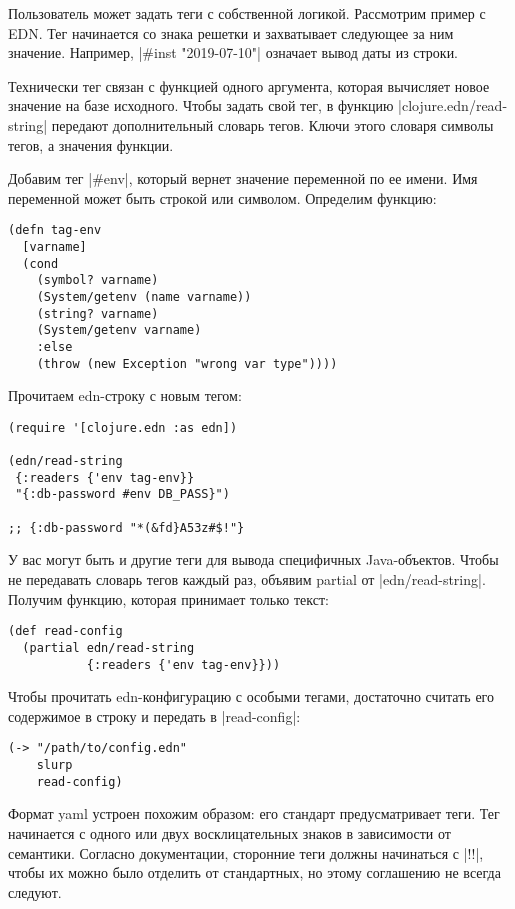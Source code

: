 Пользователь может задать теги с собственной логикой. Рассмотрим пример с
EDN. Тег начинается со знака решетки и захватывает следующее за ним
значение. Например, \spverb|#inst "2019-07-10"| означает вывод даты из строки.

Технически тег связан с функцией одного аргумента, которая вычисляет новое
значение на базе исходного. Чтобы задать свой тег, в функцию
\spverb|clojure.edn/read-string| передают дополнительный словарь тегов. Ключи этого
словаря символы тегов, а значения функции.

Добавим тег \spverb|#env|, который вернет значение переменной по ее имени. Имя
переменной может быть строкой или символом. Определим функцию:

\begin{verbatim}
(defn tag-env
  [varname]
  (cond
    (symbol? varname)
    (System/getenv (name varname))
    (string? varname)
    (System/getenv varname)
    :else
    (throw (new Exception "wrong var type"))))
\end{verbatim}

Прочитаем edn-строку с новым тегом:

\begin{verbatim}
(require '[clojure.edn :as edn])

(edn/read-string
 {:readers {'env tag-env}}
 "{:db-password #env DB_PASS}")

;; {:db-password "*(&fd}A53z#$!"}
\end{verbatim}

У вас могут быть и другие теги для вывода специфичных Java-объектов. Чтобы не
передавать словарь тегов каждый раз, объявим partial от
\spverb|edn/read-string|. Получим функцию, которая принимает только текст:

\begin{verbatim}
(def read-config
  (partial edn/read-string
           {:readers {'env tag-env}}))
\end{verbatim}

Чтобы прочитать edn-конфигурацию с особыми тегами, достаточно считать его
содержимое в строку и передать в \spverb|read-config|:

\begin{verbatim}
(-> "/path/to/config.edn"
    slurp
    read-config)
\end{verbatim}

Формат yaml устроен похожим образом: его стандарт предусматривает теги. Тег
начинается с одного или двух восклицательных знаков в зависимости от
семантики. Согласно документации, сторонние теги должны начинаться с \spverb|!!|, чтобы
их можно было отделить от стандартных, но этому соглашению не всегда следуют.

